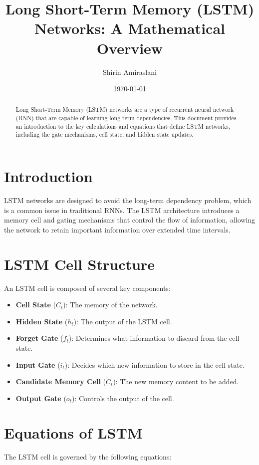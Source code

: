 \documentclass{article}
\title{Long Short-Term Memory (LSTM) Networks: A Mathematical Overview}
\author{Shirin Amiraslani}
\date{\today}
\begin{document}
\maketitle

\begin{abstract}
Long Short-Term Memory (LSTM) networks are a type of recurrent neural network (RNN) that are capable of learning long-term dependencies. This document provides an introduction to the key calculations and equations that define LSTM networks, including the gate mechanisms, cell state, and hidden state updates.
\end{abstract}

\section{Introduction}
LSTM networks are designed to avoid the long-term dependency problem, which is a common issue in traditional RNNs. The LSTM architecture introduces a memory cell and gating mechanisms that control the flow of information, allowing the network to retain important information over extended time intervals.

\section{LSTM Cell Structure}
An LSTM cell is composed of several key components:
\begin{itemize}
    \item \textbf{Cell State} (\(C_t\)): The memory of the network.
    \item \textbf{Hidden State} (\(h_t\)): The output of the LSTM cell.
    \item \textbf{Forget Gate} (\(f_t\)): Determines what information to discard from the cell state.
    \item \textbf{Input Gate} (\(i_t\)): Decides which new information to store in the cell state.
    \item \textbf{Candidate Memory Cell} (\(\tilde{C}_t\)): The new memory content to be added.
    \item \textbf{Output Gate} (\(o_t\)): Controls the output of the cell.
\end{itemize}

\section{Equations of LSTM}
The LSTM cell is governed by the following equations:
\end{document}
